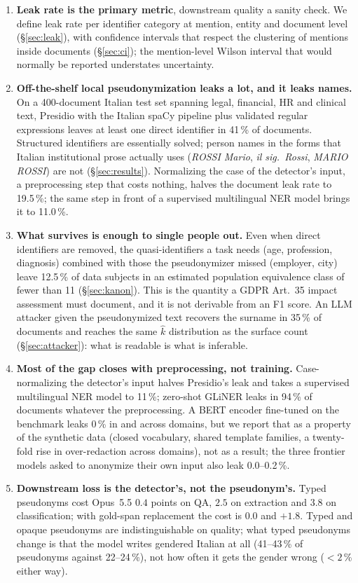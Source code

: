 \documentclass[11pt,a4paper]{article}
\begin{document}
\begin{enumerate}[nosep]
\item \textbf{Leak rate is the primary metric}, downstream quality a sanity check. We define leak rate per identifier category at mention, entity and document level (\S\ref{sec:leak}), with confidence intervals that respect the clustering of mentions inside documents (\S\ref{sec:ci}); the mention-level Wilson interval that would normally be reported understates uncertainty.
\item \textbf{Off-the-shelf local pseudonymization leaks a lot, and it leaks names.} On a 400-document Italian test set spanning legal, financial, HR and clinical text, Presidio with the Italian spaCy pipeline plus validated regular expressions leaves at least one direct identifier in 41\,\% of documents. Structured identifiers are essentially solved; person names in the forms that Italian institutional prose actually uses (\emph{ROSSI Mario}, \emph{il sig.\ Rossi}, \emph{MARIO ROSSI}) are not (\S\ref{sec:results}). Normalizing the case of the detector's input, a preprocessing step that costs nothing, halves the document leak rate to 19.5\,\%; the same step in front of a supervised multilingual NER model brings it to 11.0\,\%.
\item \textbf{What survives is enough to single people out.} Even when direct identifiers are removed, the quasi-identifiers a task needs (age, profession, diagnosis) combined with those the pseudonymizer missed (employer, city) leave 12.5\,\% of data subjects in an estimated population equivalence class of fewer than 11 (\S\ref{sec:kanon}). This is the quantity a GDPR Art.~35 impact assessment must document, and it is not derivable from an F1 score. An LLM attacker given the pseudonymized text recovers the surname in 35\,\% of documents and reaches the same $\hat k$ distribution as the surface count (\S\ref{sec:attacker}): what is readable is what is inferable.
\item \textbf{Most of the gap closes with preprocessing, not training.} Case-normalizing the detector's input halves Presidio's leak and takes a supervised multilingual NER model to 11\,\%; zero-shot GLiNER leaks in 94\,\% of documents whatever the preprocessing. A BERT encoder fine-tuned on the benchmark leaks 0\,\% in and across domains, but we report that as a property of the synthetic data (closed vocabulary, shared template families, a twenty-fold rise in over-redaction across domains), not as a result; the three frontier models asked to anonymize their own input also leak 0.0--0.2\,\%.
\item \textbf{Downstream loss is the detector's, not the pseudonym's.} Typed pseudonyms cost Opus~5.5 $0.4$ points on QA, $2.5$ on extraction and $3.8$ on classification; with gold-span replacement the cost is $0.0$ and $+1.8$. Typed and opaque pseudonyms are indistinguishable on quality; what typed pseudonyms change is that the model writes gendered Italian at all (41--43\,\% of pseudonyms against 22--24\,\%), not how often it gets the gender wrong ($<2$\,\% either way).
\end{enumerate}
\end{document}
